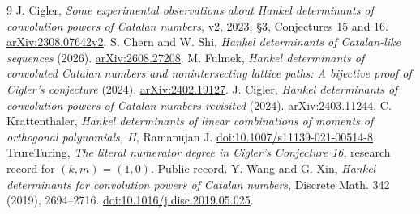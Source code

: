 \documentclass[11pt]{article}
\begin{document}
\begin{thebibliography}{9}
 J. Cigler, \emph{Some experimental observations about Hankel determinants of convolution powers of Catalan numbers}, v2, 2023, \S3, Conjectures 15 and 16. \href{https://arxiv.org/abs/2308.07642v2}{arXiv:2308.07642v2}.
 S. Chern and W. Shi, \emph{Hankel determinants of Catalan-like sequences} (2026). \href{https://arxiv.org/abs/2608.27208}{arXiv:2608.27208}.
 M. Fulmek, \emph{Hankel determinants of convoluted Catalan numbers and nonintersecting lattice paths: A bijective proof of Cigler's conjecture} (2024). \href{https://arxiv.org/abs/2402.19127}{arXiv:2402.19127}.
 J. Cigler, \emph{Hankel determinants of convolution powers of Catalan numbers revisited} (2024). \href{https://arxiv.org/abs/2403.11244}{arXiv:2403.11244}.
 C. Krattenthaler, \emph{Hankel determinants of linear combinations of moments of orthogonal polynomials, II}, Ramanujan J. \href{https://doi.org/10.1007/s11139-021-00514-8}{doi:10.1007/s11139-021-00514-8}.
 TrureTuring, \emph{The literal numerator degree in Cigler's Conjecture 16}, research record for $(k,m)=(1,0)$. \href{https://www.trureturing.org/research/cigler-sixteen-literal-numerator-degree/}{Public record}.
 Y. Wang and G. Xin, \emph{Hankel determinants for convolution powers of Catalan numbers}, Discrete Math. 342 (2019), 2694--2716. \href{https://doi.org/10.1016/j.disc.2019.05.025}{doi:10.1016/j.disc.2019.05.025}.
\end{thebibliography}
\end{document}
